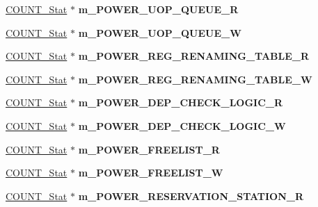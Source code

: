 \begin{DoxyCompactItemize}
\item 
\hypertarget{classall__stats__c_a878b749877ae6b39cc834bba1031df05}{
\hyperlink{classCOUNT__Stat}{COUNT\_\-Stat} $\ast$ {\bfseries m\_\-POWER\_\-UOP\_\-QUEUE\_\-R}}
\label{classall__stats__c_a878b749877ae6b39cc834bba1031df05}

\item 
\hypertarget{classall__stats__c_a85feff5bdb785440fc7582e964f209af}{
\hyperlink{classCOUNT__Stat}{COUNT\_\-Stat} $\ast$ {\bfseries m\_\-POWER\_\-UOP\_\-QUEUE\_\-W}}
\label{classall__stats__c_a85feff5bdb785440fc7582e964f209af}

\item 
\hypertarget{classall__stats__c_a4bcb4b9d0d6c1ac6947eeb56a6a7452c}{
\hyperlink{classCOUNT__Stat}{COUNT\_\-Stat} $\ast$ {\bfseries m\_\-POWER\_\-REG\_\-RENAMING\_\-TABLE\_\-R}}
\label{classall__stats__c_a4bcb4b9d0d6c1ac6947eeb56a6a7452c}

\item 
\hypertarget{classall__stats__c_a10abd0801b9a4b03e54bb5710efb1998}{
\hyperlink{classCOUNT__Stat}{COUNT\_\-Stat} $\ast$ {\bfseries m\_\-POWER\_\-REG\_\-RENAMING\_\-TABLE\_\-W}}
\label{classall__stats__c_a10abd0801b9a4b03e54bb5710efb1998}

\item 
\hypertarget{classall__stats__c_a972d618ee31c13219fe6639165386be1}{
\hyperlink{classCOUNT__Stat}{COUNT\_\-Stat} $\ast$ {\bfseries m\_\-POWER\_\-DEP\_\-CHECK\_\-LOGIC\_\-R}}
\label{classall__stats__c_a972d618ee31c13219fe6639165386be1}

\item 
\hypertarget{classall__stats__c_abc7fa0f4f14cc6ff9496667b07c62c53}{
\hyperlink{classCOUNT__Stat}{COUNT\_\-Stat} $\ast$ {\bfseries m\_\-POWER\_\-DEP\_\-CHECK\_\-LOGIC\_\-W}}
\label{classall__stats__c_abc7fa0f4f14cc6ff9496667b07c62c53}

\item 
\hypertarget{classall__stats__c_afb1407324ec84a6b9e38a407e7d03238}{
\hyperlink{classCOUNT__Stat}{COUNT\_\-Stat} $\ast$ {\bfseries m\_\-POWER\_\-FREELIST\_\-R}}
\label{classall__stats__c_afb1407324ec84a6b9e38a407e7d03238}

\item 
\hypertarget{classall__stats__c_a3c759f7ef887ad599663431a1d7cbc0b}{
\hyperlink{classCOUNT__Stat}{COUNT\_\-Stat} $\ast$ {\bfseries m\_\-POWER\_\-FREELIST\_\-W}}
\label{classall__stats__c_a3c759f7ef887ad599663431a1d7cbc0b}

\item 
\hypertarget{classall__stats__c_a3b095f802a3038f785d37bc8bb0747f3}{
\hyperlink{classCOUNT__Stat}{COUNT\_\-Stat} $\ast$ {\bfseries m\_\-POWER\_\-RESERVATION\_\-STATION\_\-R}}
\label{classall__stats__c_a3b095f802a3038f785d37bc8bb0747f3}


\end{DoxyCompactItemize}
